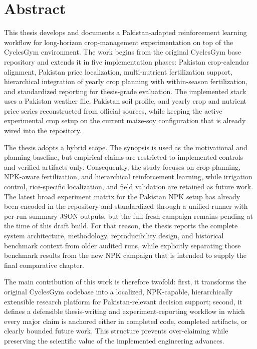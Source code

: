 \chapter*{Abstract}
\thispagestyle{empty}
This thesis develops and documents a Pakistan-adapted reinforcement learning workflow for long-horizon crop-management experimentation on top of the CyclesGym environment. The work begins from the original CyclesGym base repository and extends it in five implementation phases: Pakistan crop-calendar alignment, Pakistan price localization, multi-nutrient fertilization support, hierarchical integration of yearly crop planning with within-season fertilization, and standardized reporting for thesis-grade evaluation. The implemented stack uses a Pakistan weather file, Pakistan soil profile, and yearly crop and nutrient price series reconstructed from official sources, while keeping the active experimental crop setup on the current maize-soy configuration that is already wired into the repository.

The thesis adopts a hybrid scope. The synopsis is used as the motivational and planning baseline, but empirical claims are restricted to implemented controls and verified artifacts only. Consequently, the study focuses on crop planning, NPK-aware fertilization, and hierarchical reinforcement learning, while irrigation control, rice-specific localization, and field validation are retained as future work. The latest broad experiment matrix for the Pakistan NPK setup has already been encoded in the repository and standardized through a unified runner with per-run summary JSON outputs, but the full fresh campaign remains pending at the time of this draft build. For that reason, the thesis reports the complete system architecture, methodology, reproducibility design, and historical benchmark context from older audited runs, while explicitly separating those benchmark results from the new NPK campaign that is intended to supply the final comparative chapter.

The main contribution of this work is therefore twofold: first, it transforms the original CyclesGym codebase into a localized, NPK-capable, hierarchically extensible research platform for Pakistan-relevant decision support; second, it defines a defensible thesis-writing and experiment-reporting workflow in which every major claim is anchored either in completed code, completed artifacts, or clearly bounded future work. This structure prevents over-claiming while preserving the scientific value of the implemented engineering advances.
\clearpage
